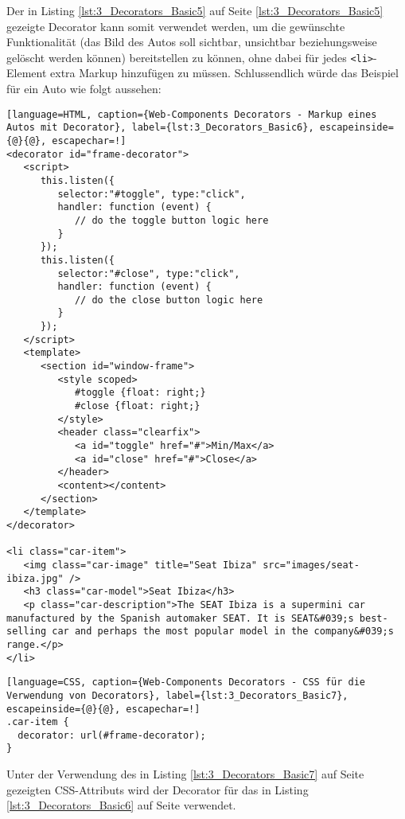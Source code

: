 Der in Listing \ref{lst:3_Decorators_Basic5} auf Seite \ref{lst:3_Decorators_Basic5} gezeigte Decorator kann somit verwendet werden, um die gewünschte Funktionalität (das Bild des Autos soll sichtbar, unsichtbar beziehungsweise gelöscht werden können) bereitstellen zu können, ohne dabei für jedes \lstinline|<li>|-Element extra Markup hinzufügen zu müssen. Schlussendlich würde das Beispiel für ein Auto wie folgt aussehen:

\begin{lstlisting}[language=HTML, caption={Web-Components Decorators - Markup eines Autos mit Decorator}, label={lst:3_Decorators_Basic6}, escapeinside={@}{@}, escapechar=!]
<decorator id="frame-decorator">
   <script>
      this.listen({
         selector:"#toggle", type:"click",
         handler: function (event) {
            // do the toggle button logic here
         }
      });
      this.listen({
         selector:"#close", type:"click",
         handler: function (event) {
            // do the close button logic here
         }
      });
   </script>
   <template>
      <section id="window-frame">
         <style scoped>
            #toggle {float: right;}
            #close {float: right;}
         </style>
         <header class="clearfix">
            <a id="toggle" href="#">Min/Max</a>
            <a id="close" href="#">Close</a>
         </header>
         <content></content>
      </section>
   </template>
</decorator>

<li class="car-item">
   <img class="car-image" title="Seat Ibiza" src="images/seat-ibiza.jpg" />
   <h3 class="car-model">Seat Ibiza</h3>
   <p class="car-description">The SEAT Ibiza is a supermini car manufactured by the Spanish automaker SEAT. It is SEAT&#039;s best-selling car and perhaps the most popular model in the company&#039;s range.</p>
</li>
\end{lstlisting}

\begin{lstlisting}[language=CSS, caption={Web-Components Decorators - CSS für die Verwendung von Decorators}, label={lst:3_Decorators_Basic7}, escapeinside={@}{@}, escapechar=!]
.car-item {
  decorator: url(#frame-decorator);
}
\end{lstlisting}

Unter der Verwendung des in Listing \ref{lst:3_Decorators_Basic7} auf Seite \pageref{lst:3_Decorators_Basic7} gezeigten CSS-Attributs wird der Decorator für das in Listing \ref{lst:3_Decorators_Basic6} auf Seite \pageref{lst:3_Decorators_Basic6} verwendet.
